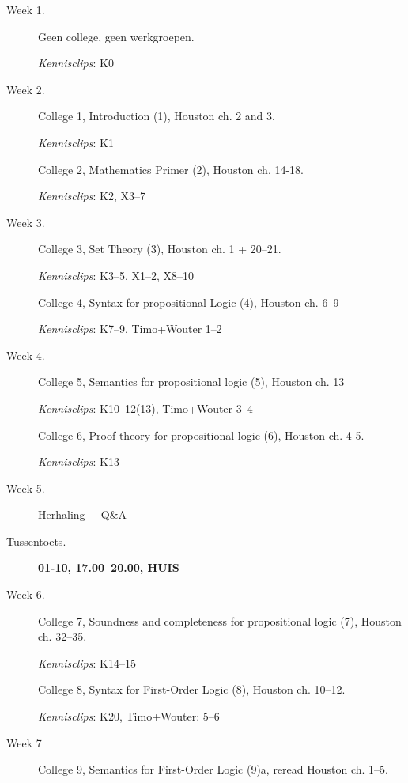 \begin{description}

  \item[Week 1.]
    Geen college, geen werkgroepen.

   \emph{Kennisclips}: K0

  \item[Week 2.]
    College 1, Introduction (1), Houston ch. 2 and 3.

   \emph{Kennisclips}: K1

  \item[\phantom{Week 2.}]
    College 2, Mathematics Primer (2), Houston ch. 14-18.

    \emph{Kennisclips}: K2, X3--7

  \item[Week 3.]
    College 3, Set Theory (3), Houston ch. 1 + 20--21.

    \emph{Kennisclips}: K3--5. X1--2, X8--10

  \item[\phantom{Week 2.}]
    College 4, Syntax for propositional Logic (4), Houston ch. 6--9

    \emph{Kennisclips}: K7--9, Timo+Wouter 1--2

  \item[Week 4.]
    College 5, Semantics for propositional logic (5), Houston ch. 13

    \emph{Kennisclips}: K10--12(13), Timo+Wouter 3--4

  \item[\phantom{Week 2.}]
    College 6, Proof theory for propositional logic (6), Houston ch. 4-5.

   \emph{Kennisclips}: K13

  \item[Week 5.]
    Herhaling + Q\&A

  \item[Tussentoets.]
    {\bf  01-10, 17.00--20.00, HUIS}

  \item[Week 6.]
    College 7, Soundness and completeness for propositional logic (7), Houston ch. 32--35.

    \emph{Kennisclips}: K14--15

  \item[\phantom{Week 6}]
    College 8, Syntax for First-Order Logic (8), Houston ch. 10--12.

    \emph{Kennisclips}: K20, Timo+Wouter: 5--6

  \item[Week 7]
    College 9, Semantics for First-Order Logic (9)a, reread Houston ch. 1--5.


\end{description}
